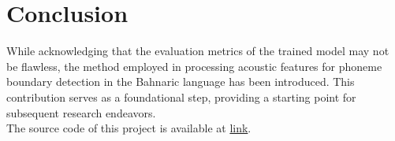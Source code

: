 \documentclass{article}
\begin{document}
\section{Conclusion}

While acknowledging that the evaluation metrics of the trained model may not be flawless, the method employed in processing acoustic features for phoneme boundary detection in the Bahnaric language has been introduced. This contribution serves as a foundational step, providing a starting point for subsequent research endeavors.\\[5mm]
The source code of this project is available at \href{https://github.com/tqtensor/bahnaric-phoneme}{link}.


\end{document}
